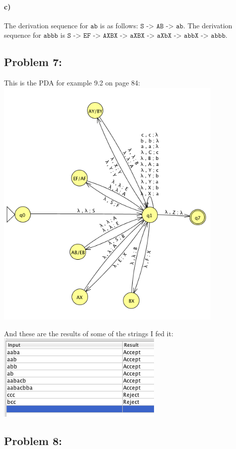 \documentclass[a4paper]{article}
\begin{document}
\paragraph{c)} The derivation sequence for $\texttt{ab}$ is as follows: $\texttt{S -> AB -> ab}$. The derivation sequence for $\texttt{abbb}$ is $\texttt{S -> EF -> AXBX -> aXBX -> aXbX -> abbX -> abbb}$.

\subsection*{Problem 7:} 

This is the PDA for example 9.2 on page 84:\\
\includegraphics[width=110mm]{7_pda.png}

And these are the results of some of the strings I fed it:\\
\includegraphics[width=80mm]{7_results.png}


\subsection*{Problem 8:} 
\end{document}
